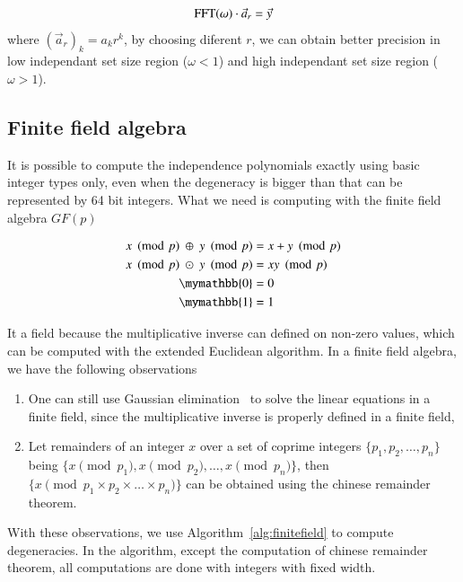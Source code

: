 \documentclass{article}
\newcommand{\<}{\langle}
\renewcommand{\>}{\rangle}
\renewcommand{\cite}[1]{{\citep{#1}}}
\theoremstyle{definition}\newtheorem{definition}{\textit{Definition}}
\begin{document}
\begin{equation}
{\rm FFT}(\omega) \cdot \vec a_r = \vec y
\end{equation}
where $(\vec a_r)_k = a_k r ^k$, by choosing diferent $r$, we can obtain better precision in low independant set size region  ($\omega<1$) and high independant set size region ($\omega>1$).

\subsection{Finite field algebra}
It is possible to compute the independence polynomials exactly using basic integer types only,
even when the degeneracy is bigger than that can be represented by 64 bit integers.
What we need is computing with the finite field algebra $GF(p)$

\begin{align}
\begin{split}
    x\pmod p ~\oplus~ y\pmod p &= x+y\pmod p\\
    x\pmod p ~\odot~ y\pmod p &= xy\pmod p\\
    \mymathbb{0} &= 0\\
    \mymathbb{1} &= 1
\end{split}
\end{align}

It a field because the multiplicative inverse can defined on non-zero values, which can be computed with the extended Euclidean algorithm.
In a finite field algebra, we have the following observations
\begin{enumerate}
    \item One can still use Gaussian elimination~\cite{Golub2013} to solve the linear equations in a finite field, since the multiplicative inverse is properly defined in a finite field,
    \item Let remainders of an integer $x$ over a set of coprime integers $\{p_1, p_2, \ldots, p_n\}$ being $\{x \pmod {p_1}, x\pmod {p_2}, \ldots, x \pmod {p_n}\}$,
    then $\{x \pmod {p_1 \times p_2 \times \ldots \times p_n}\}$ can be obtained using the chinese remainder theorem.
\end{enumerate}
With these observations, we use Algorithm~\ref{alg:finitefield} to compute degeneracies.
In the algorithm, except the computation of chinese remainder theorem, all computations are done with integers with fixed width.
\end{document}
